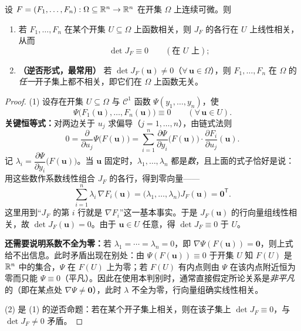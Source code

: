\begin{theorem}[雅可比行列式为零的判别]\label{thm:jacobian-dependence}
设 \(F=(F_1,\dots,F_n):\Omega\subseteq\mathbb{R}^n\to\mathbb{R}^n\) 在开集 \(\Omega\) 上连续可微。则
\begin{enumerate}[label=(\arabic*)]
  \item 若 \(F_1,\dots,F_n\) 在某个开集 \(U\subseteq\Omega\) 上函数相关，则 \(J_F\) 的各行在 \(U\) 上线性相关，从而
  \[
  \det J_F\equiv0\qquad(\text{在 }U\text{ 上});
  \]
  \item \textbf{（逆否形式，最常用）} 若 \(\det J_F(\mathbf{u})\ne0\)（\(\forall\,\mathbf{u}\in\Omega\)），则 \(F_1,\dots,F_n\) 在 \(\Omega\) 的\emph{任一}开子集上都不相关，即它们在 \(\Omega\) 上函数无关。
\end{enumerate}
\end{theorem}

\begin{proof}
(1) 设存在开集 \(U\subseteq\Omega\) 与 \(\mathcal C^1\) 函数 \(\Psi(y_1,\dots,y_n)\)，使
\[
\Psi\bigl(F_1(\mathbf{u}),\dots,F_n(\mathbf{u})\bigr)\equiv0\qquad(\forall\,\mathbf{u}\in U).
\]
\textbf{关键恒等式：}对两边关于 \(u_j\) 求偏导（\(j=1,\dots,n\)），由链式法则
\[
0=\frac{\partial}{\partial u_j}\Psi\bigl(F(\mathbf{u})\bigr)
=\sum_{i=1}^n \frac{\partial\Psi}{\partial y_i}\bigl(F(\mathbf{u})\bigr)\cdot\frac{\partial F_i}{\partial u_j}(\mathbf{u}).
\]
记 \(\lambda_i=\dfrac{\partial\Psi}{\partial y_i}\bigl(F(\mathbf{u})\bigr)\)。当 \(\mathbf{u}\) 固定时，\(\lambda_1,\dots,\lambda_n\) 都是\emph{数}，且上面的式子恰好是说：用这些数作系数线性组合 \(J_F\) 的各行，得到零向量——
\[
\sum_{i=1}^n\lambda_i\,\nabla F_i(\mathbf{u})
=\bigl(\lambda_1,\dots,\lambda_n\bigr)J_F(\mathbf{u})=\mathbf 0^{\mathsf T}.
\]
这里用到“\(J_F\) 的第 \(i\) 行就是 \(\nabla F_i\)”这一基本事实。于是 \(J_F(\mathbf{u})\) 的行向量组线性相关，故 \(\det J_F(\mathbf{u})=0\)。由于 \(\mathbf{u}\in U\) 任意，得 \(\det J_F\equiv0\) 于 \(U\)。

\textbf{还需要说明系数不全为零：}若 \(\lambda_1=\cdots=\lambda_n=0\)，即 \(\nabla\Psi(F(\mathbf{u}))=\mathbf 0\)，则上式给不出信息。此时矛盾出现在别处：由 \(\Psi(F(\mathbf{u}))\equiv0\) 于开集 \(U\) 知 \(F(U)\) 是 \(\mathbb{R}^n\) 中的集合，\(\Psi\) 在 \(F(U)\) 上为零；若 \(F(U)\) 有内点则由 \(\Psi\) 在该内点附近恒为零而只能 \(\Psi\equiv0\)（平凡）。因此在使用本判别时，通常直接假定所论关系是\emph{非平凡}的（即在某点处 \(\nabla\Psi\ne\mathbf 0\)），此时 \(\lambda\) 不全为零，行向量组确实线性相关。

(2) 是 (1) 的逆否命题：若在某个开子集上相关，则在该子集上 \(\det J_F\equiv0\)，与 \(\det J_F\ne0\) 矛盾。
\end{proof}

